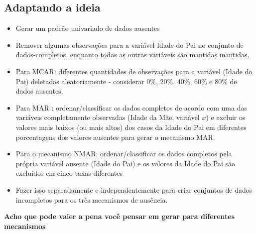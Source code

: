 \documentclass[11pt]{article}
\begin{document}
\subsection*{Adaptando a ideia}
\begin{itemize}
  \item Gerar um padrão univariado de dados ausentes
  \item Remover algumas observações para a variável Idade do Pai no conjunto de dados-completos, enquanto todas as outras variáveis são mantidas mantidas.
  \item Para MCAR: diferentes quantidades de observações para a variável (Idade do Pai)  deletadas aleatoriamente - considerar 0\%, 20\%, 40\%, 60\% e 80\% de dados ausentes.
  \item Para MAR : ordenar/classificar os dados completos de acordo com uma das variáveis completamente observadas (Idade da Mãe, variável $x$) e excluir os valores mais baixos (ou mais altos) dos casos da Idade do Pai em diferentes porcentagens dos valores ausentes para gerar o mecanismo MAR.
  \item Para o mecanismo NMAR: ordenar/classificar os dados completos pela própria variável ausente (Idade do Pai) e os valores da Idade do Pai são excluídos em cinco taxas diferentes
  \item Fazer isso  separadamente e independentemente para criar conjuntos de dados incompletos para os três mecanismos de ausência.
\end{itemize}

\textbf{Acho que pode valer a pena você pensar em gerar para diferentes mecanismos}
\end{document}
